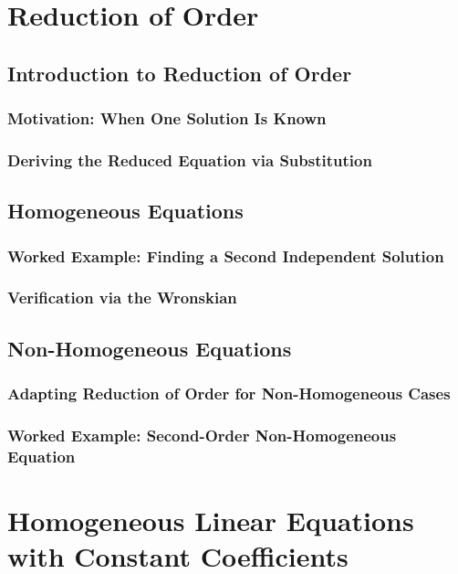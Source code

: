 \documentclass[10pt]{article}
\begin{document}
\section{Reduction of Order}

\subsection{Introduction to Reduction of Order}
    \subsubsection{Motivation: When One Solution Is Known}
    \subsubsection{Deriving the Reduced Equation via Substitution}

\subsection{Homogeneous Equations}
    \subsubsection{Worked Example: Finding a Second Independent Solution}
    \subsubsection{Verification via the Wronskian}

\subsection{Non-Homogeneous Equations}
    \subsubsection{Adapting Reduction of Order for Non-Homogeneous Cases}
    \subsubsection{Worked Example: Second-Order Non-Homogeneous Equation}

\section{Homogeneous Linear Equations with Constant Coefficients}
\end{document}
